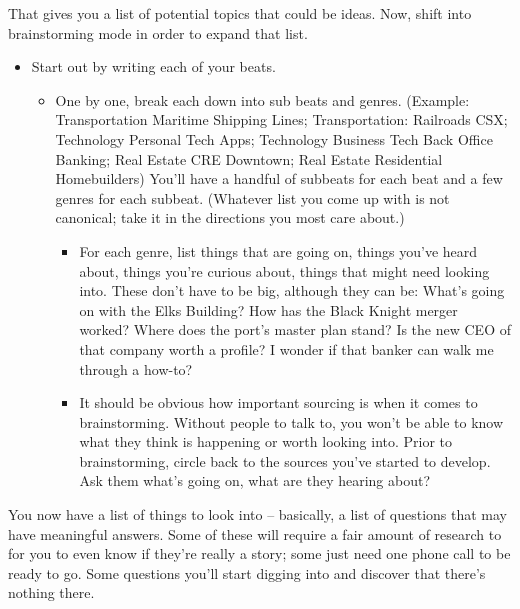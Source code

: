 \documentclass[
  12pt,
  american,
  letterpaperpaper,
  extrafontsizes,onecolumn,openright
  ]{memoir}
\providecommand{\tightlist}{%
  \setlength{\itemsep}{0pt}\setlength{\parskip}{0pt}}
\begin{document}
That gives you a list of potential topics that could be ideas. Now, shift into brainstorming mode in order to expand that list.

\begin{itemize}
\tightlist
\item
  Start out by writing each of your beats.

  \begin{itemize}
  \tightlist
  \item
    One by one, break each down into sub beats and genres. (Example: Transportation \textbar{} Maritime \textbar{} Shipping Lines; Transportation: Railroads \textbar{} CSX; Technology \textbar{} Personal Tech \textbar{} Apps; Technology \textbar{} Business Tech \textbar{} Back Office Banking; Real Estate \textbar{} CRE \textbar{} Downtown; Real Estate \textbar{} Residential \textbar{} Homebuilders) You'll have a handful of subbeats for each beat and a few genres for each subbeat. (Whatever list you come up with is not canonical; take it in the directions you most care about.)

    \begin{itemize}
    \tightlist
    \item
      For each genre, list things that are going on, things you've heard about, things you're curious about, things that might need looking into. These don't have to be big, although they can be: What's going on with the Elks Building? How has the Black Knight merger worked? Where does the port's master plan stand? Is the new CEO of that company worth a profile? I wonder if that banker can walk me through a how-to?
    \item
      It should be obvious how important sourcing is when it comes to brainstorming. Without people to talk to, you won't be able to know what they think is happening or worth looking into. Prior to brainstorming, circle back to the sources you've started to develop. Ask them what's going on, what are they hearing about?
    \end{itemize}
  \end{itemize}
\end{itemize}

You now have a list of things to look into -- basically, a list of questions that may have meaningful answers. Some of these will require a fair amount of research to for you to even know if they're really a story; some just need one phone call to be ready to go. Some questions you'll start digging into and discover that there's nothing there.
\end{document}
